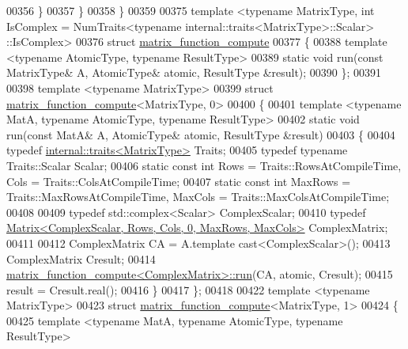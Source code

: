 \begin{DoxyCode}
00356     \}
00357   \}
00358 \}
00359 
00375 template <typename MatrixType, int IsComplex = NumTraits<typename internal::traits<MatrixType>::Scalar>
      ::IsComplex>
00376 \textcolor{keyword}{struct }\hyperlink{struct_eigen_1_1internal_1_1matrix__function__compute}{matrix\_function\_compute}
00377 \{  
00388     \textcolor{keyword}{template} <\textcolor{keyword}{typename} AtomicType, \textcolor{keyword}{typename} ResultType> 
00389     \textcolor{keyword}{static} \textcolor{keywordtype}{void} run(\textcolor{keyword}{const} MatrixType& A, AtomicType& atomic, ResultType &result);    
00390 \};
00391 
00398 \textcolor{keyword}{template} <\textcolor{keyword}{typename} MatrixType>
00399 \textcolor{keyword}{struct }\hyperlink{struct_eigen_1_1internal_1_1matrix__function__compute}{matrix\_function\_compute}<MatrixType, 0>
00400 \{  
00401   \textcolor{keyword}{template} <\textcolor{keyword}{typename} MatA, \textcolor{keyword}{typename} AtomicType, \textcolor{keyword}{typename} ResultType>
00402   \textcolor{keyword}{static} \textcolor{keywordtype}{void} run(\textcolor{keyword}{const} MatA& A, AtomicType& atomic, ResultType &result)
00403   \{
00404     \textcolor{keyword}{typedef} \hyperlink{struct_eigen_1_1internal_1_1traits}{internal::traits<MatrixType>} Traits;
00405     \textcolor{keyword}{typedef} \textcolor{keyword}{typename} Traits::Scalar Scalar;
00406     \textcolor{keyword}{static} \textcolor{keyword}{const} \textcolor{keywordtype}{int} Rows = Traits::RowsAtCompileTime, Cols = Traits::ColsAtCompileTime;
00407     \textcolor{keyword}{static} \textcolor{keyword}{const} \textcolor{keywordtype}{int} MaxRows = Traits::MaxRowsAtCompileTime, MaxCols = Traits::MaxColsAtCompileTime;
00408 
00409     \textcolor{keyword}{typedef} std::complex<Scalar> ComplexScalar;
00410     \textcolor{keyword}{typedef} \hyperlink{group___core___module_class_eigen_1_1_matrix}{Matrix<ComplexScalar, Rows, Cols, 0, MaxRows, MaxCols>}
       ComplexMatrix;
00411 
00412     ComplexMatrix CA = A.template cast<ComplexScalar>();
00413     ComplexMatrix Cresult;
00414     \hyperlink{struct_eigen_1_1internal_1_1matrix__function__compute_a55a328773f5254d0cd29ac699bc2634f}{matrix\_function\_compute<ComplexMatrix>::run}(CA, atomic, 
      Cresult);
00415     result = Cresult.real();
00416   \}
00417 \};
00418 
00422 \textcolor{keyword}{template} <\textcolor{keyword}{typename} MatrixType>
00423 \textcolor{keyword}{struct }\hyperlink{struct_eigen_1_1internal_1_1matrix__function__compute}{matrix\_function\_compute}<MatrixType, 1>
00424 \{
00425   \textcolor{keyword}{template} <\textcolor{keyword}{typename} MatA, \textcolor{keyword}{typename} AtomicType, \textcolor{keyword}{typename} ResultType>

\end{DoxyCode}
